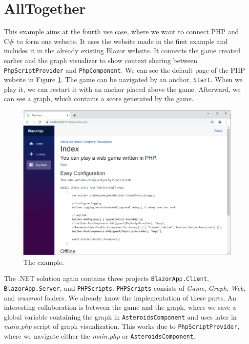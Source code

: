 \section{AllTogether}

This example aims at the fourth use case, where we want to connect PHP and C\# to form one website.
It uses the website made in the first example and includes it in the already existing Blazor website.
It connects the game created earlier and the graph visualizer to show context sharing between \texttt{PhpScriptProvider} and \texttt{PhpComponent}.
We can see the default page of the PHP website in Figure \ref{img30:allTogether}.
The game can be navigated by an anchor, \texttt{Start}.
When we play it, we can restart it with an anchor placed above the game.
Afterward, we can see a graph, which contains a score generated by the game. 
\par
\begin{figure}\centering
\includegraphics[scale=0.5]{./img/AllTogether}
\caption{The example.}
\label{img30:allTogether}
\end{figure} 
\par
The .NET solution again contains three projects \texttt{BlazorApp.Client}, \texttt{BlazorApp.Server}, and \texttt{PHPScripts}.
\texttt{PHPScripts} consists of \textit{Game}, \textit{Graph}, \textit{Web}, and \textit{wwwroot} folders.
We already know the implementation of these parts.
An interesting collaboration is between the game and the graph, where we save a global variable containing the graph in \texttt{AsteroidsComponent} and uses later in \textit{main.php} script of graph visualization.
This works due to \texttt{PhpScriptProvider}, where we navigate either the \textit{main.php} or \texttt{AsteroidsComponent}.
